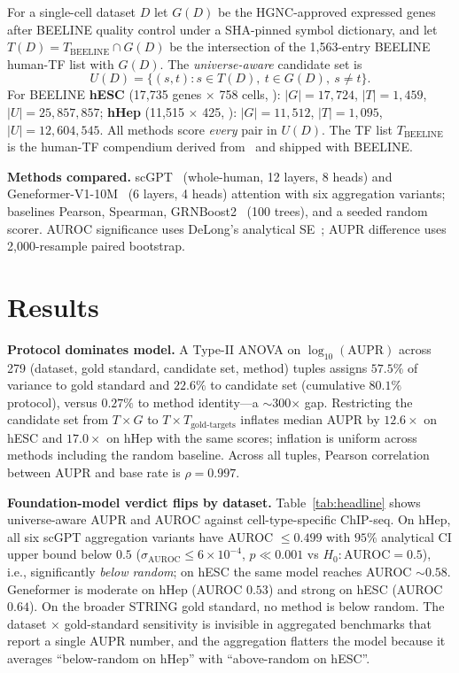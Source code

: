 \documentclass[sigconf, nonacm, anonymous]{acmart}
\begin{document}
For a single-cell dataset $D$ let $G(D)$ be the HGNC-approved expressed
genes after BEELINE quality control under a SHA-pinned symbol
dictionary, and let $T(D) = T_{\text{BEELINE}} \cap G(D)$ be the
intersection of the 1{,}563-entry BEELINE human-TF list with $G(D)$.
The \emph{universe-aware} candidate set is
\[
U(D) = \{ (s,t) : s \in T(D),\ t \in G(D),\ s \neq t \}.
\]
For BEELINE \textbf{hESC} (17{,}735 genes $\times$ 758 cells,
\cite{chu2016hesc}): $|G|{=}17{,}724$, $|T|{=}1{,}459$,
$|U|{=}25{,}857{,}857$; \textbf{hHep} (11{,}515 $\times$ 425,
\cite{camp2017hhep}): $|G|{=}11{,}512$, $|T|{=}1{,}095$,
$|U|{=}12{,}604{,}545$. All methods score \emph{every} pair in $U(D)$.
The TF list $T_{\text{BEELINE}}$ is the human-TF compendium derived
from~\cite{lambert2018tfs} and shipped with BEELINE.

\textbf{Methods compared.} scGPT~\cite{cui2024scgpt} (whole-human, 12
layers, 8 heads) and Geneformer-V1-10M~\cite{theodoris2023geneformer}
(6 layers, 4 heads) attention with six aggregation variants;
baselines Pearson, Spearman,
GRNBoost2~\cite{moerman2019grnboost2,huynh2010genie3} (100 trees), and
a seeded random scorer. AUROC significance uses DeLong's analytical
SE~\cite{delong1988}; AUPR difference uses 2{,}000-resample paired
bootstrap.

\section{Results}

\textbf{Protocol dominates model.}
A Type-II ANOVA on $\log_{10}(\text{AUPR})$ across 279
(dataset, gold standard, candidate set, method) tuples assigns
$57.5\%$ of variance to gold standard and $22.6\%$ to candidate set
(cumulative $80.1\%$ protocol), versus $0.27\%$ to method identity---a
$\sim$300$\times$ gap. Restricting the candidate set from $T \times G$
to $T \times T_{\text{gold-targets}}$ inflates median AUPR by
$12.6\times$ on hESC and $17.0\times$ on hHep with the same scores;
inflation is uniform across methods including the random baseline.
Across all tuples, Pearson correlation between AUPR and base rate is
$\rho = 0.997$.

\textbf{Foundation-model verdict flips by dataset.}
Table~\ref{tab:headline} shows universe-aware AUPR and AUROC against
cell-type-specific ChIP-seq. On hHep, all six scGPT aggregation
variants have AUROC $\le 0.499$ with $95\%$ analytical CI
upper bound below $0.5$ ($\sigma_{\text{AUROC}} \le 6\!\times\!10^{-4}$,
$p \ll 0.001$ vs $H_0: \text{AUROC}=0.5$), i.e., significantly
\emph{below random}; on hESC the same model reaches AUROC $\sim 0.58$.
Geneformer is moderate on hHep (AUROC $0.53$) and strong on hESC
(AUROC $0.64$). On the broader STRING gold standard, no method is
below random. The dataset $\times$ gold-standard sensitivity is
invisible in aggregated benchmarks that report a single AUPR number,
and the aggregation flatters the model because it averages
``below-random on hHep'' with ``above-random on hESC''.
\end{document}
